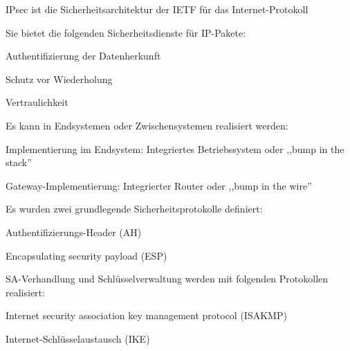 \documentclass[a4paper]{article}
\begin{document}
\begin{multicols}{3}
\begin{itemize*}
            \begin{itemize*}
                  \item
                  IPsec ist die Sicherheitsarchitektur der IETF für das
                  Internet-Protokoll
                  \item
                  Sie bietet die folgenden Sicherheitsdienste für IP-Pakete:

                  \begin{itemize*}
                        \item Authentifizierung der Datenherkunft
                        \item Schutz vor Wiederholung
                        \item Vertraulichkeit
                  \end{itemize*}
                  \item
                  Es kann in Endsystemen oder Zwischensystemen realisiert werden:

                  \begin{itemize*}
                        \item Implementierung im Endsystem: Integriertes Betriebssystem oder ,,bump in the stack''
                        \item Gateway-Implementierung: Integrierter Router oder ,,bump in the wire''
                  \end{itemize*}
                  \item
                  Es wurden zwei grundlegende Sicherheitsprotokolle definiert:

                  \begin{itemize*}
                        \item Authentifizierungs-Header (AH)
                        \item Encapsulating security payload (ESP)
                  \end{itemize*}
                  \item
                  SA-Verhandlung und Schlüsselverwaltung werden mit folgenden
                  Protokollen realisiert:

                  \begin{itemize*}
                        \item Internet security association key management protocol (ISAKMP)
                        \item Internet-Schlüsselaustausch (IKE)
                  \end{itemize*}
            \end{itemize*}



\end{itemize*}
\end{multicols}
\end{document}
